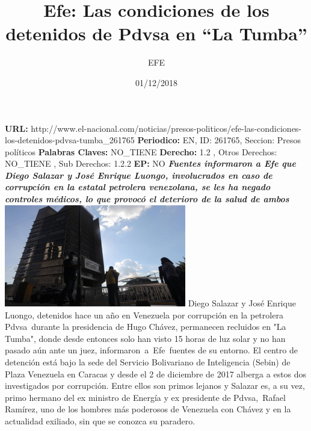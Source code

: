 \documentclass{article}%
\title{\textbf{Efe: Las condiciones de los detenidos de Pdvsa en “La Tumba”}}%
\author{EFE}%
\date{01/12/2018}%
\begin{document}
%
\normalsize%
\maketitle%
\textbf{URL: }%
http://www.el{-}nacional.com/noticias/presos{-}politicos/efe{-}las{-}condiciones{-}los{-}detenidos{-}pdvsa{-}tumba\_261765\newline%
%
\textbf{Periodico: }%
EN, %
ID: %
261765, %
Seccion: %
Presos políticos\newline%
%
\textbf{Palabras Claves: }%
NO\_TIENE\newline%
%
\textbf{Derecho: }%
1.2%
, Otros Derechos: %
NO\_TIENE%
, Sub Derechos: %
1.2.2%
\newline%
%
\textbf{EP: }%
NO\newline%
\newline%
%
\textbf{\textit{Fuentes informaron a Efe que Diego Salazar y José Enrique Luongo, involucrados en caso de corrupción en la estatal petrolera venezolana, se les ha negado controles médicos, lo que provocó el deterioro de la salud de ambos}}%
\newline%
\newline%
%
\includegraphics[width=300px]{9.jpg}%
\newline%
%
Diego Salazar y José Enrique Luongo, detenidos hace un año en Venezuela por corrupción en la petrolera Pdvsa~durante la presidencia de Hugo Chávez, permanecen recluidos en "La Tumba", donde desde entonces solo han visto 15 horas de luz solar y no han pasado aún ante un juez, informaron~a~Efe~fuentes de su entorno.%
\newline%
%
El centro de detención está bajo la sede del Servicio Bolivariano de Inteligencia (Sebin) de Plaza Venezuela en Caracas y desde el 2 de diciembre de 2017 alberga a estos dos investigados por corrupción.%
\newline%
%
Entre ellos son primos lejanos y Salazar es, a su vez, primo hermano del ex ministro de Energía y ex presidente de Pdvsa,~Rafael Ramírez, uno de los hombres más poderosos de Venezuela con Chávez y en la actualidad exiliado, sin que se conozca su paradero.%
\end{document}
